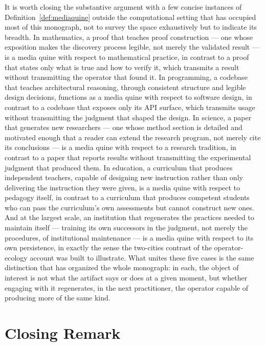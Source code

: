 \documentclass[11pt]{book}
\begin{document}
It is worth closing the substantive argument with a few concise instances of Definition~\ref{def:mediaquine} outside the computational setting that has occupied most of this monograph, not to survey the space exhaustively but to indicate its breadth. In mathematics, a proof that teaches proof construction --- one whose exposition makes the discovery process legible, not merely the validated result --- is a media quine with respect to mathematical practice, in contrast to a proof that states only what is true and how to verify it, which transmits a result without transmitting the operator that found it. In programming, a codebase that teaches architectural reasoning, through consistent structure and legible design decisions, functions as a media quine with respect to software design, in contrast to a codebase that exposes only its API surface, which transmits usage without transmitting the judgment that shaped the design. In science, a paper that generates new researchers --- one whose method section is detailed and motivated enough that a reader can extend the research program, not merely cite its conclusions --- is a media quine with respect to a research tradition, in contrast to a paper that reports results without transmitting the experimental judgment that produced them. In education, a curriculum that produces independent teachers, capable of designing new instruction rather than only delivering the instruction they were given, is a media quine with respect to pedagogy itself, in contrast to a curriculum that produces competent students who can pass the curriculum's own assessments but cannot construct new ones. And at the largest scale, an institution that regenerates the practices needed to maintain itself --- training its own successors in the judgment, not merely the procedures, of institutional maintenance --- is a media quine with respect to its own persistence, in exactly the sense the two-cities contrast of the operator-ecology account was built to illustrate. What unites these five cases is the same distinction that has organized the whole monograph: in each, the object of interest is not what the artifact says or does at a given moment, but whether engaging with it regenerates, in the next practitioner, the operator capable of producing more of the same kind.

\section{Closing Remark}
\end{document}
